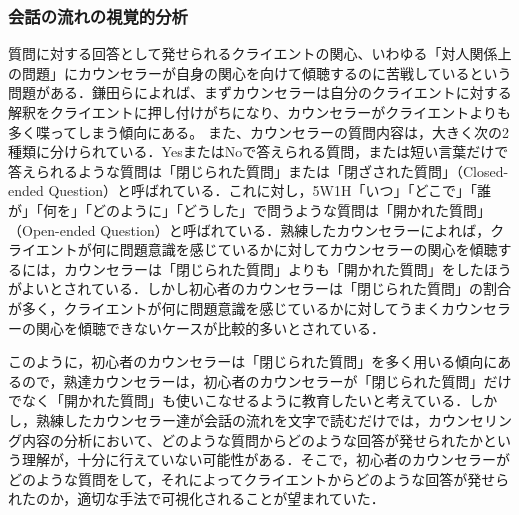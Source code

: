 \documentclass[shuuron]{kuee}
\begin{document}


\subsubsection{会話の流れの視覚的分析}




質問に対する回答として発せられるクライエントの関心、いわゆる「対人関係上の問題」にカウンセラーが自身の関心を向けて傾聴するのに苦戦しているという問題がある．鎌田ら\cite{Darshana}によれば、まずカウンセラーは自分のクライエントに対する解釈をクライエントに押し付けがちになり、カウンセラーがクライエントよりも多く喋ってしまう傾向にある。
また、カウンセラーの質問内容は，大きく次の2種類に分けられている．YesまたはNoで答えられる質問，または短い言葉だけで答えられるような質問は「閉じられた質問」または「閉ざされた質問」（Closed-ended Question）と呼ばれている．これに対し，5W1H「いつ」「どこで」「誰が」「何を」「どのように」「どうした」で問うような質問は「開かれた質問」（Open-ended Question）と呼ばれている．熟練したカウンセラーによれば，クライエントが何に問題意識を感じているかに対してカウンセラーの関心を傾聴するには，カウンセラーは「閉じられた質問」よりも「開かれた質問」をしたほうがよいとされている\cite{ivey}．しかし初心者のカウンセラーは「閉じられた質問」の割合が多く，クライエントが何に問題意識を感じているかに対してうまくカウンセラーの関心を傾聴できないケースが比較的多いとされている．


このように，初心者のカウンセラーは「閉じられた質問」を多く用いる傾向にあるので，熟達カウンセラーは，初心者のカウンセラーが「閉じられた質問」だけでなく「開かれた質問」も使いこなせるように教育したいと考えている．しかし，熟練したカウンセラー達が会話の流れを文字で読むだけでは，カウンセリング内容の分析において、どのような質問からどのような回答が発せられたかという理解が，十分に行えていない可能性がある．そこで，初心者のカウンセラーがどのような質問をして，それによってクライエントからどのような回答が発せられたのか，適切な手法で可視化されることが望まれていた．
\end{document}
